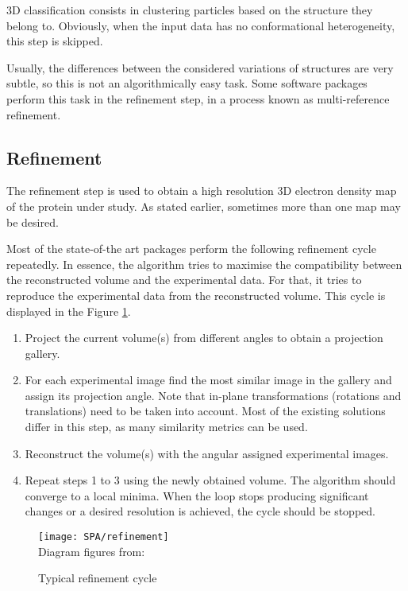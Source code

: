 \documentclass[../main.tex]{subfiles}
\begin{document}
3D classification consists in clustering particles based on the structure they belong to. Obviously, when the input data has no conformational heterogeneity, this step is skipped.

Usually, the differences between the considered variations of structures are very subtle, so this is not an algorithmically easy task. Some software packages perform this task in the refinement step, in a process known as multi-reference refinement.

\subsection{Refinement}
The refinement step is used to obtain a high resolution 3D electron density map of the protein under study. As stated earlier, sometimes more than one map may be desired. 

Most of the state-of-the art packages perform the following refinement cycle repeatedly. In essence, the algorithm tries to maximise the compatibility between the reconstructed volume and the experimental data. For that, it tries to reproduce the experimental data from the reconstructed volume. This cycle is displayed in the Figure \ref{fig:2:refinement}.

\begin{enumerate}
    \item Project the current volume(s) from different angles to obtain a projection gallery.
    \item For each experimental image find the most similar image in the gallery and assign its projection angle. Note that in-plane transformations (rotations and translations) need to be taken into account. Most of the existing solutions differ in this step, as many similarity metrics can be used.
    \item Reconstruct the volume(s) with the angular assigned experimental images.
    \item Repeat steps 1 to 3 using the newly obtained volume. The algorithm should converge to a local minima\cite{sigworth2015}. When the loop stops producing significant changes or a desired resolution is achieved, the cycle should be stopped.
\end{enumerate}

\begin{figure}[htbp]
    \centering
    \texttt{[image: SPA/refinement]}\\
    Diagram figures from: \cite{nogales2015}
    \caption{Typical refinement cycle}
    \label{fig:2:refinement}
\end{figure}
\end{document}
